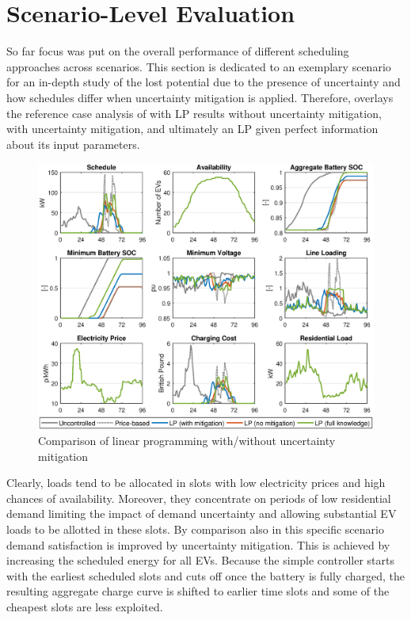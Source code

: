 \section{Scenario-Level Evaluation}
\label{sec:sceneval}

So far focus was put on the overall performance of different scheduling approaches across scenarios. This section is dedicated to an exemplary scenario for an in-depth study of the lost potential due to the presence of uncertainty and how schedules differ when uncertainty mitigation is applied. Therefore,  overlays the reference case analysis of  with LP results without uncertainty mitigation, with uncertainty mitigation, and ultimately an LP given perfect information about its input parameters.

\begin{figure}[]
	\includegraphics[width=\textwidth,trim={2cm 0cm 1.5cm 0cm},clip]{figures/evaluation/scen/99.eps}
	\caption{Comparison of linear programming with/without uncertainty mitigation}
	\label{fig:99}
\end{figure}

Clearly, loads tend to be allocated in slots with low electricity prices and high chances of availability. Moreover, they concentrate on periods of low residential demand limiting the impact of demand uncertainty and allowing substantial EV loads to be allotted in these slots. By comparison also in this specific scenario demand satisfaction is improved by uncertainty mitigation. This is achieved by increasing the scheduled energy for all EVs. Because the simple controller starts with the earliest scheduled slots and cuts off once the battery is fully charged, the resulting aggregate charge curve is shifted to earlier time slots and some of the cheapest slots are less exploited.

